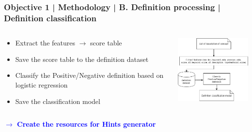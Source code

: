 \documentclass{beamer}
\begin{document}
\begin{frame}
\frametitle{Objective 1 | Methodology | B. Definition processing | Definition classification}
\begin{columns}

	\begin{column}{.55\textwidth}
		\begin{itemize}
			\item Extract the features $\rightarrow$ score table
			\item Save the score table to the definition dataset
			\item Classify the Positive/Negative definition based on logistic regression
			\item Save the classification model
		\end{itemize}
	
	\end{column}
	\begin{column}{.55\textwidth}
	\includegraphics[width=50mm]{dc3.png}
\end{column}
	
	
\end{columns}
\begin{center}
	
\end{center}
\textcolor{blue}{\textbf{$\rightarrow$ Create the resources for Hints generator}}
\end{frame}
\end{document}
